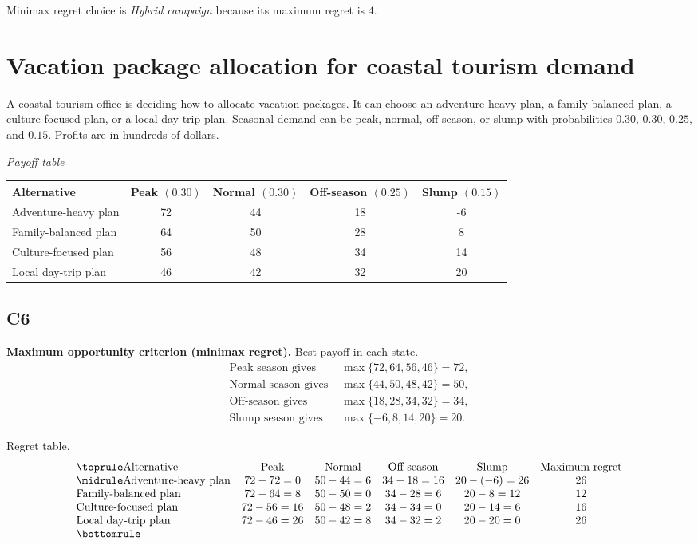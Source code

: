 \begin{ExamProblems}
		Minimax regret choice is \emph{Hybrid campaign} because its maximum regret is $4$.

		\item
		\section{Vacation package allocation for coastal tourism demand}
		A coastal tourism office is deciding how to allocate vacation packages. It can choose an adventure-heavy plan, a family-balanced plan, a culture-focused plan, or a local day-trip plan. Seasonal demand can be peak, normal, off-season, or slump with probabilities $0.30$, $0.30$, $0.25$, and $0.15$. Profits are in hundreds of dollars.

		\begin{center}
			\textit{Payoff table}\\
			\begin{tabular}{l c c c c}
				\toprule
				Alternative & Peak $(0.30)$ & Normal $(0.30)$ & Off-season $(0.25)$ & Slump $(0.15)$ \\
				\midrule
				Adventure-heavy plan & 72 & 44 & 18 & -6 \\
				Family-balanced plan & 64 & 50 & 28 & 8 \\
				Culture-focused plan & 56 & 48 & 34 & 14 \\
				Local day-trip plan & 46 & 42 & 32 & 20 \\
				\bottomrule
			\end{tabular}
		\end{center}

		\subsection*{C6}
		\textbf{Maximum opportunity criterion (minimax regret).} Best payoff in each state.
		\[
		\begin{aligned}
		\text{Peak season gives } &\max\{72,64,56,46\}=72,\\
		\text{Normal season gives } &\max\{44,50,48,42\}=50,\\
		\text{Off-season gives } &\max\{18,28,34,32\}=34,\\
		\text{Slump season gives } &\max\{-6,8,14,20\}=20.
		\end{aligned}
		\]

		Regret table.
		\[
		\begin{array}{lccccc}
			\toprule
			\text{Alternative} & \text{Peak} & \text{Normal} & \text{Off-season} & \text{Slump} & \text{Maximum regret}\\
			\midrule
			\text{Adventure-heavy plan} & 72-72=0 & 50-44=6 & 34-18=16 & 20-(-6)=26 & 26\\
			\text{Family-balanced plan} & 72-64=8 & 50-50=0 & 34-28=6 & 20-8=12 & 12\\
			\text{Culture-focused plan} & 72-56=16 & 50-48=2 & 34-34=0 & 20-14=6 & 16\\
			\text{Local day-trip plan} & 72-46=26 & 50-42=8 & 34-32=2 & 20-20=0 & 26\\
			\bottomrule
		\end{array}
		\]


\end{ExamProblems}
